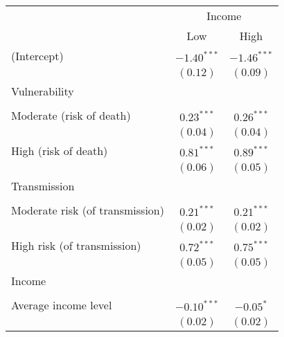 
\begin{table}
\begin{center}
\begin{scriptsize}
\begin{tabular}{l c c}
\hline
 & \multicolumn{2}{c}{Income} \\
\cline{2-3}
 & Low & High \\
\hline
(Intercept)                                     & $-1.40^{***}$ & $-1.46^{***}$ \\
                                                & $(0.12)$      & $(0.09)$      \\
Vulnerability                                   &               &               \\
                                                &               &               \\
\quad Moderate (risk of death)                  & $0.23^{***}$  & $0.26^{***}$  \\
                                                & $(0.04)$      & $(0.04)$      \\
\quad High (risk of death)                      & $0.81^{***}$  & $0.89^{***}$  \\
                                                & $(0.06)$      & $(0.05)$      \\
Transmission                                    &               &               \\
                                                &               &               \\
\quad Moderate risk (of transmission)           & $0.21^{***}$  & $0.21^{***}$  \\
                                                & $(0.02)$      & $(0.02)$      \\
\quad High risk (of transmission)               & $0.72^{***}$  & $0.75^{***}$  \\
                                                & $(0.05)$      & $(0.05)$      \\
Income                                          &               &               \\
                                                &               &               \\
\quad Average income level                      & $-0.10^{***}$ & $-0.05^{*}$   \\
                                                & $(0.02)$      & $(0.02)$      \\

\end{tabular}
\end{scriptsize}
\end{center}
\end{table}
